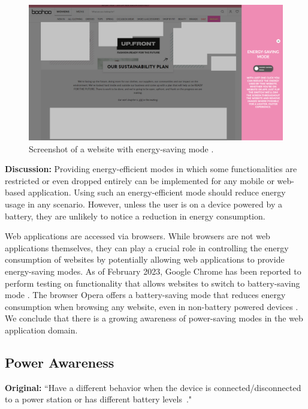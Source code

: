 \begin{figure}
    \centering
    \includegraphics[width=\linewidth]{RQ1/Img/boohoo.png}
    \caption{Screenshot of a website with energy-saving mode \cite{boohoo-website}.}
    \label{fig:boohoo}
\end{figure}

\textbf{Discussion:} Providing energy-efficient modes in which some functionalities are restricted or even dropped entirely can be implemented for any mobile or web-based application. Using such an energy-efficient mode should reduce energy usage in any scenario. However, unless the user is on a device powered by a battery, they are unlikely to notice a reduction in energy consumption. 

Web applications are accessed via browsers. While browsers are not web applications themselves, they can play a crucial role in controlling the energy consumption of websites by potentially allowing web applications to provide energy-saving modes. As of February 2023, Google Chrome has been reported to perform testing on functionality that allows websites to switch to battery-saving mode \cite{chrome-battery-saving-mode} \cite{github-battery-saving-demo}. The browser Opera offers a battery-saving mode that reduces energy consumption when browsing any website, even in non-battery powered devices \cite{opera-battery-saver}. We conclude that there is a growing awareness of power-saving modes in the web application domain.

\subsection{Power Awareness} \label{sec:patterns-PowerAwareness}
\textbf{Original:} ``Have a different behavior when the device is connected/disconnected to a power station or has different battery levels~\cite{cruz2019catalog}."

